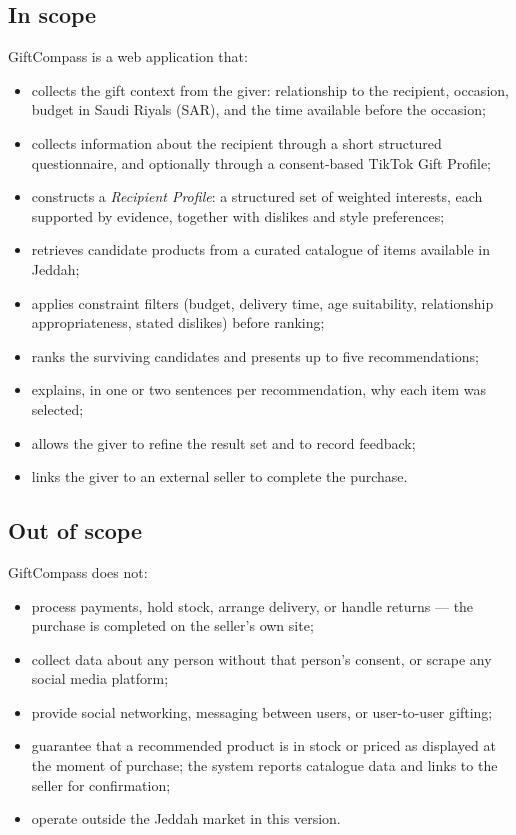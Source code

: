 \documentclass[11pt,a4paper]{report}
\begin{document}
\subsection*{In scope}
GiftCompass is a web application that:
\begin{itemize}
  \item collects the gift context from the giver: relationship to the recipient, occasion,
        budget in Saudi Riyals (SAR), and the time available before the occasion;
  \item collects information about the recipient through a short structured questionnaire,
        and optionally through a consent-based TikTok Gift Profile;
  \item constructs a \emph{Recipient Profile}: a structured set of weighted interests, each
        supported by evidence, together with dislikes and style preferences;
  \item retrieves candidate products from a curated catalogue of items available in Jeddah;
  \item applies constraint filters (budget, delivery time, age suitability, relationship
        appropriateness, stated dislikes) before ranking;
  \item ranks the surviving candidates and presents up to five recommendations;
  \item explains, in one or two sentences per recommendation, why each item was selected;
  \item allows the giver to refine the result set and to record feedback;
  \item links the giver to an external seller to complete the purchase.
\end{itemize}

\subsection*{Out of scope}
GiftCompass does not:
\begin{itemize}
  \item process payments, hold stock, arrange delivery, or handle returns --- the purchase is
        completed on the seller's own site;
  \item collect data about any person without that person's consent, or scrape any social
        media platform;
  \item provide social networking, messaging between users, or user-to-user gifting;
  \item guarantee that a recommended product is in stock or priced as displayed at the moment
        of purchase; the system reports catalogue data and links to the seller for
        confirmation;
  \item operate outside the Jeddah market in this version.
\end{itemize}
\end{document}
